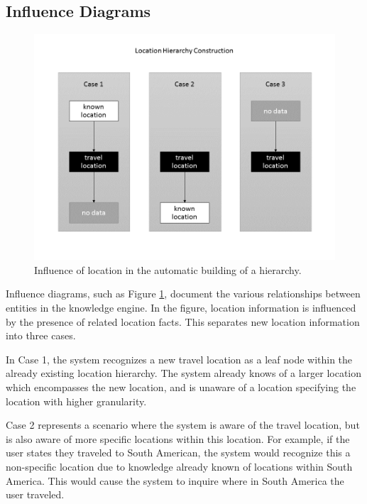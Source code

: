 \documentclass[11pt]{article} %
\begin{document}
\subsection{Influence Diagrams}
\begin{figure}[!htb]
\centering
\includegraphics[width=12cm]{location_hierarchy.png}
\caption{Influence of location in the automatic building of a hierarchy.\label{fig:hierarchy1}}
\end{figure}
Influence diagrams, such as Figure \ref{fig:hierarchy1}, document the various relationships between entities in the knowledge engine. In the figure, location information is influenced by the presence of related location facts. This separates new location information into three cases.

In Case 1, the system recognizes a new travel location as a leaf node within the already existing location hierarchy. The system already knows of a larger location which encompasses the new location, and is unaware of a location specifying the location with higher granularity.

Case 2 represents a scenario where the system is aware of the travel location, but is also aware of more specific locations within this location. For example, if the user states they traveled to South American, the system would recognize this a non-specific location due to knowledge already known of locations within South America. This would cause the system to inquire where in South America the user traveled.
\end{document}
